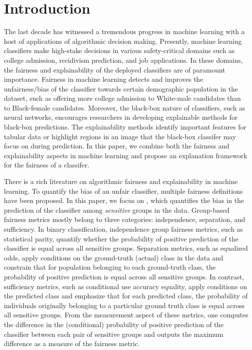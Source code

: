 \clearpage
{}

\section{Introduction}
The last decade has witnessed a tremendous progress in machine learning with a host of applications of algorithmic decision making. Presently, machine learning classifiers make high-stake decisions in various safety-critical domains such as college admission, recidivism prediction, and job applications. In these domains, the fairness and explainability of the deployed classifiers are of paramount importance. Fairness in machine learning detects and improves the unfairness/bias of the classifier towards certain demographic population in the dataset, such as offering more college admission to White-male candidates than to Black-female candidates. Moreover, the black-box nature of classifiers, such as neural networks, encourages researchers in developing explainable methods for black-box predictions. The explainability methods identify important features for tabular data or highlight regions in an image that the black-box classifer may focus on during prediction. In this paper, we combine both the fairness and explainability aspects in machine learning and propose an explanation framework for the fairness of a classifer. 





There is a rich literature on algorithmic fairness and explainability in machine learning. To quantify the bias of an unfair classifier, multiple fairness definitions have been proposed. In this paper, we focus on , which quantifies the bias in the prediction of the classifier among \emph{sensitive} groups in the data. Group-based fairness metrics mostly belong to three categories: independence, separation, and sufficiency. In binary classification, independence group fairness metrics, such as statistical parity, quantify whether the probability of positive prediction of the classifier is equal across all sensitive groups. Separation metrics, such as equalized odds, apply conditions on the ground-truth (actual) class in the data and constrain that for population belonging to each ground-truth class, the probability of positive prediction is equal across all sensitive groups. In contrast, sufficiency metrics, such as conditional use accuracy equality, apply conditions on the predicted class and emphasize that for each predicted class, the probability of individuals originally belonging to a particular ground truth class is equal across all sensitive groups. From the measurement aspect of these metrics, one  computes the difference in the (conditional)  probability of positive prediction of the classifier between each pair of sensitive groups and outputs the maximum difference as a measure of the fairness metric. 

